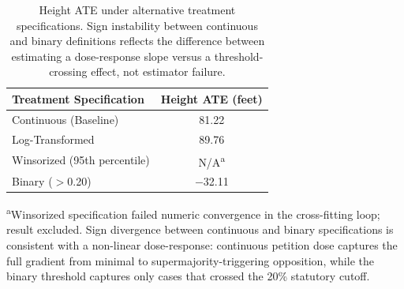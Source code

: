 \begin{table}[H]
\centering
\caption[Treatment Definition Robustness]{Height ATE under alternative treatment specifications. Sign instability between continuous and binary definitions reflects the difference between estimating a dose-response slope versus a threshold-crossing effect, not estimator failure.}
\label{tab:treatment_robustness}
\begin{tabular}{lc}
\toprule
\textbf{Treatment Specification} & \textbf{Height ATE (feet)} \\
\midrule
Continuous (Baseline)             & \phantom{$-$}81.22  \\
Log-Transformed                   & \phantom{$-$}89.76  \\
Winsorized (95th percentile)      & N/A\textsuperscript{a} \\
Binary ($>$0.20)                  & $-$32.11            \\
\bottomrule
\end{tabular}
\par\smallskip
\footnotesize \textsuperscript{a}Winsorized specification failed numeric convergence in the cross-fitting loop; result excluded. Sign divergence between continuous and binary specifications is consistent with a non-linear dose-response: continuous petition dose captures the full gradient from minimal to supermajority-triggering opposition, while the binary threshold captures only cases that crossed the 20\% statutory cutoff.
\end{table}
